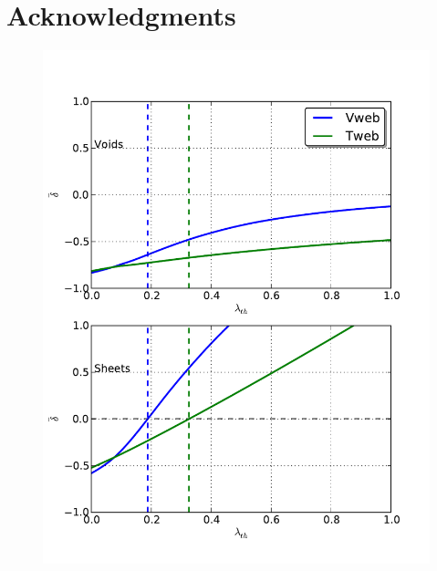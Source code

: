 \documentclass[usenatbib]{latex/mn2e}
\begin{document}
\section*{Acknowledgments}  



 






\begin{flushleft}
\begin{figure}
\begin{center}

  \includegraphics[trim = 0mm 10mm 12mm 19mm, clip, keepaspectratio=true,
  width=0.3\textheight]{./figures/cell_types_density.pdf}


\end{center}
\end{figure}
\end{flushleft}
\end{document}
